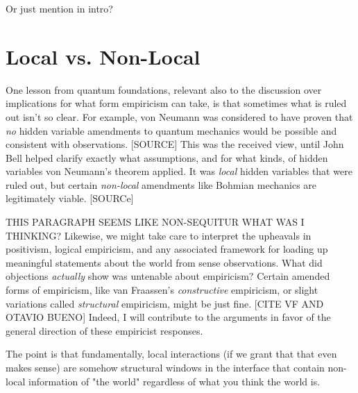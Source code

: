 Or just mention in intro?



\section{Local vs. Non-Local}

One lesson from quantum foundations, relevant also to the discussion over implications for what form empiricism can take, is that sometimes what is ruled out isn't so clear.  For example, von Neumann was considered to have proven that \emph{no} hidden variable amendments to quantum mechanics would be possible and consistent with observations.  [SOURCE]  This was the received view, until John Bell helped clarify exactly what assumptions, and for what kinds, of hidden variables von Neumann's theorem applied.  It was \emph{local} hidden variables that were ruled out, but certain \emph{non-local} amendments like Bohmian mechanics are legitimately viable.  [SOURCe]


THIS PARAGRAPH SEEMS LIKE NON-SEQUITUR WHAT WAS I THINKING?
Likewise, we might take care to interpret the upheavals in positivism, logical empiricism, and any associated framework for loading up meaningful statements about the world from sense observations.  What did objections \emph{actually} show was untenable about empiricism?  Certain amended forms of empiricism, like van Fraassen's \emph{constructive} empiricism, or slight variations called \emph{structural} empiricism, might be just fine.  [CITE VF AND OTAVIO BUENO]  Indeed, I will contribute to the arguments in favor of the general direction of these empiricist responses. 

The point is that fundamentally, local interactions (if we grant that that even makes sense) are somehow structural windows in the interface that contain non-local information of "the world" regardless of what you think the world is.



